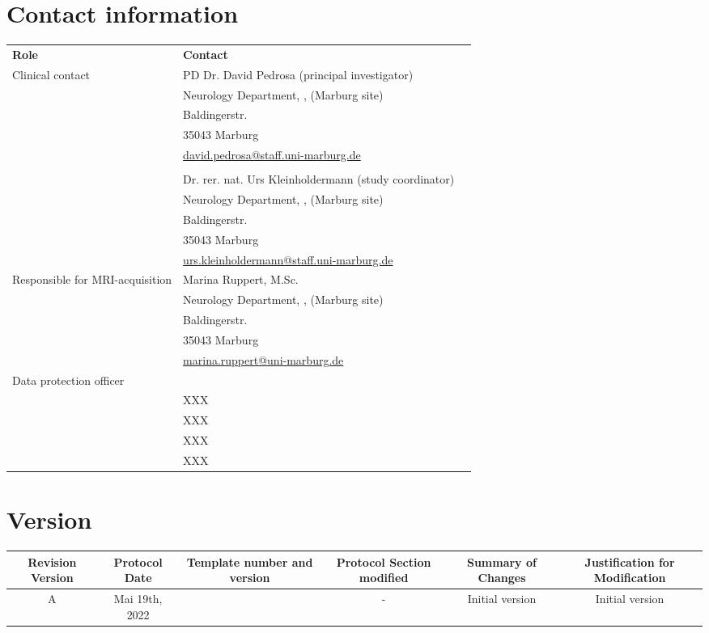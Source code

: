 \section{Contact information}
\begin{tabularx}{0.85\textwidth}{@{}lp{8cm} *{1}{l} @{}}
\toprule
\textbf{Role} & \textbf{Contact} \\
\cmidrule{1-2}
Clinical contact 	& PD Dr. David Pedrosa (principal investigator) \\
			& Neurology Department, \UKGM, (Marburg site)\\
			& Baldingerstr.\\
			& 35043 Marburg\\
			& \href{mailto:david.pedrosa@staff.uni-marburg.de}{david.pedrosa@staff.uni-marburg.de}\\
	\\
			& Dr. rer. nat. Urs Kleinholdermann (study coordinator) \\
			& Neurology Department, \UKGM, (Marburg site)\\
			& Baldingerstr.\\
			& 35043 Marburg\\
			& \href{mailto:urs.kleinholdermann@staff.uni-marburg.de}{urs.kleinholdermann@staff.uni-marburg.de}\\

\cmidrule{1-2}
Responsible for \ac{MRI}-acquisition & Marina Ruppert, M.Sc.\\
			& Neurology Department, \UKGM, (Marburg site)\\
			& Baldingerstr.\\
			& 35043 Marburg\\
			& \href{mailto:marina.ruppert@uni-marburg.de}{marina.ruppert@uni-marburg.de}\\
\cmidrule{1-2}
Data protection officer & \\
			& XXX\\
			& XXX\\
			& XXX\\
			& XXX\\
\bottomrule
\end{tabularx}
\newpage

\section{Version}
\begin{tabularx}{1\textwidth}{@{}C *{5}{C}@{}}
\toprule
\textbf{Revision Version} & \textbf{Protocol Date} & \textbf{Template number and version} & \textbf{Protocol Section modified} & \textbf{Summary of Changes} & \textbf{Justification for Modification}\\
\midrule
A & Mai 19th, 2022 &  & - & Initial version & Initial version \\

\end{tabularx}


